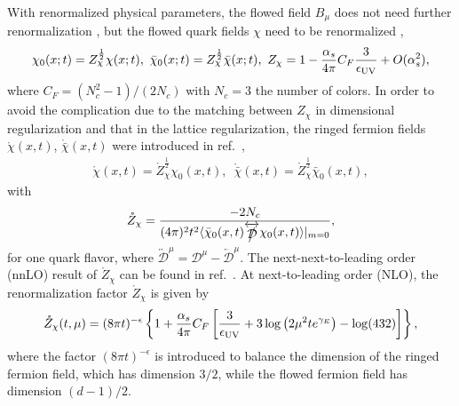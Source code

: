 With renormalized physical parameters, the flowed field $B_{\mu}$ does not need further renormalization \cite{Luscher:2010iy,Luscher:2011bx}, but the flowed quark fields $\chi$ need to be  renormalized \cite{Luscher:2013cpa},
\begin{eqnarray}
\chi_{0}(x; t) = Z_{\chi}^{\frac{1}{2}} \chi(x; t), \, \, \bar{\chi}_0(x; t) = Z_{\chi}^{\frac{1}{2}} \bar{\chi}(x; t), \, \,  Z_{\chi} = 1- \frac{\alpha_s}{4\pi}C_F \frac{3}{\epsilon_{\rm UV}} + O(\alpha_s^2),
\end{eqnarray}
where $C_F = (N_c^2-1)/(2N_c)$ with $N_c=3$ the number of colors.
In order to avoid the complication due to the matching between $ Z_{\chi}$ in dimensional regularization and that in the lattice regularization, the ringed fermion fields $\mathring{\chi}(x,t)$, $\mathring{\bar{\chi}}(x,t)$ were introduced in ref.~\cite{Makino:2014taa},
\begin{eqnarray}
\mathring{\chi}(x,t) = \mathring{Z}_{\chi}^{\frac{1}{2}}\chi_{0}(x,t),\, \,  \, \mathring{\bar{\chi}}(x,t) = \mathring{Z}_{\chi}^{\frac{1}{2}}\bar{\chi}_{0}(x,t),
\end{eqnarray}
with
\begin{eqnarray}
 \mathring{Z}_{\chi}=\frac{-2N_c}{(4\pi)^2t^2
\langle \bar{\chi}_{0}(x,t)\overleftrightarrow{\slashed{\mathcal{D}}}\chi_{0}(x,t)\rangle|_{m=0}},
\end{eqnarray}
for one quark flavor, where $\overleftrightarrow{\mathcal{D}}^{\mu} = {\mathcal{D}}^{\mu}  - \overleftarrow{\mathcal{D}}^{\mu}$. The next-next-to-leading order (nnLO) result of $\mathring{Z}_{\chi}$ can be found in  ref.~\cite{Artz:2019bpr}. At next-to-leading order (NLO), the renormalization factor $ \mathring{Z}_{\chi}$ is given by \cite{Makino:2014taa}
\begin{eqnarray}
\label{eq:ringedfermionren}
\mathring{Z}_{\chi}(t, \mu) = (8\pi t)^{-\epsilon}\left\{1+  \frac{\alpha_s}{4\pi}C_F\left[\frac{3}{\epsilon_{\rm UV}} + 3\log\left(2\mu^2 te^{\gamma_E}\right)-\log(432)\right] \right\},
\end{eqnarray}
where  the factor $(8\pi t)^{-\epsilon}$ is introduced to balance the dimension of the ringed fermion field, which has dimension $3/2$, while the flowed fermion field has dimension $(d-1)/2$.




